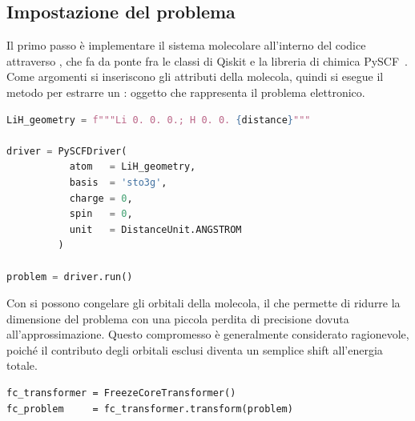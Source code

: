 \subsection{Impostazione del problema}

Il primo passo è implementare il sistema molecolare all'interno del codice attraverso , che fa da ponte fra le classi di Qiskit e la libreria di chimica PySCF~\cite{pyscf}. Come argomenti si inseriscono gli attributi della molecola, quindi si esegue il metodo  per estrarre un : oggetto che rappresenta il problema elettronico. 

\begin{tcolorbox}[title=Dichiarazione molecola]
\begin{lstlisting}[language=Python]
LiH_geometry = f"""Li 0. 0. 0.; H 0. 0. {distance}"""

driver = PySCFDriver(
           atom   = LiH_geometry,
           basis  = 'sto3g',
           charge = 0,
           spin   = 0,
           unit   = DistanceUnit.ANGSTROM
         )

problem = driver.run()
\end{lstlisting}
\vspace{-0.2cm}
\end{tcolorbox}

Con  si possono congelare gli orbitali  della molecola, il che permette di ridurre la dimensione del problema con una piccola perdita di precisione dovuta all'approssimazione. Questo compromesso è generalmente considerato ragionevole, poiché il contributo degli orbitali esclusi diventa un semplice shift all'energia totale.

\begin{tcolorbox}[title=Congelamento orbitali core e hamiltoniana]
\begin{lstlisting}
fc_transformer = FreezeCoreTransformer()
fc_problem     = fc_transformer.transform(problem)
\end{lstlisting}
\vspace{-0.2cm}
\end{tcolorbox}


